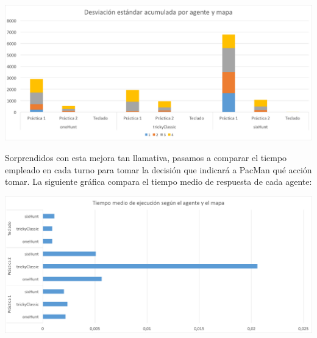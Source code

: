\documentclass[12pt]{article}
\begin{document}
\begin{center}
    \includegraphics[width=16.7cm]{stdDev}
\end{center}

Sorprendidos con esta mejora tan llamativa, pasamos a comparar el tiempo empleado en cada turno para tomar la decisión que indicará a PacMan qué acción tomar. La siguiente gráfica compara el tiempo medio de respuesta de cada agente:


\begin{center}
    \includegraphics[width=16.7cm]{tiempoRespuesta}
\end{center}
\end{document}
